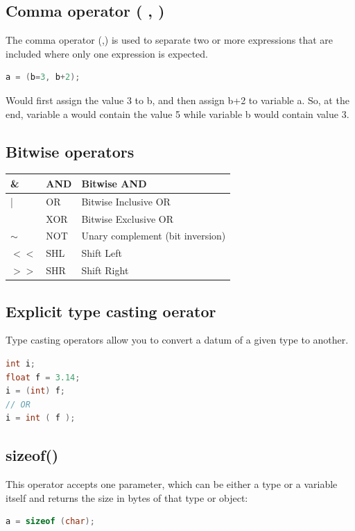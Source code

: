 \documentclass[12pt,oneside]{book}
\begin{document}
\subsection{Comma operator ( , )}
The comma operator (,) is used to separate two or more expressions that are included where only one expression is expected.
	\begin{lstlisting}[language=C++]
    a = (b=3, b+2);
\end{lstlisting}
Would first assign the value 3 to b, and then assign b+2 to variable a. So, at the end, variable a would contain the value 5 while variable b would contain value 3.
\subsection{Bitwise operators}
\begin{tabular}{|l|l|l|}
	\hline
	\&       & AND & Bitwise AND                      \\ \hline
	|        & OR  & Bitwise Inclusive OR             \\ \hline
	$\hat{}$ & XOR & Bitwise Exclusive OR             \\ \hline
	$\sim$   & NOT & Unary complement (bit inversion) \\ \hline
	$<<$     & SHL & Shift Left                       \\ \hline
	$>>$     & SHR & Shift Right                      \\ \hline
\end{tabular}
\subsection{Explicit type casting oerator}
Type casting operators allow you to convert a datum of a given type to another.
	\begin{lstlisting}[language=C++]
int i; 
float f = 3.14;
i = (int) f; 
// OR
i = int ( f );
\end{lstlisting}
\subsection{sizeof()}
This operator accepts one parameter, which can be either a type or a variable itself and returns the size in bytes of that type or object:
\begin{lstlisting}[language=C++]
a = sizeof (char);
\end{lstlisting}
\end{document}

